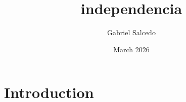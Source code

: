 \documentclass{article}
\title{independencia}
\author{Gabriel Salcedo}
\date{March 2026}
\begin{document}
\maketitle

\section{Introduction}
\end{document}
